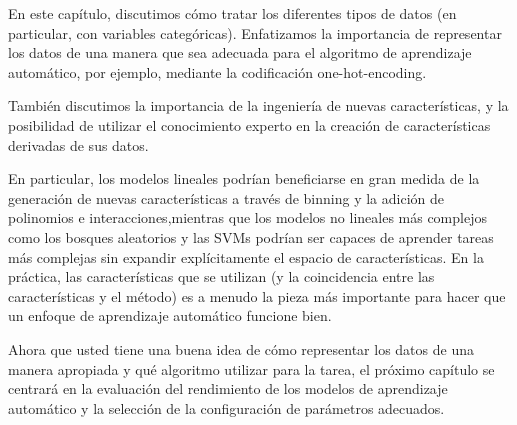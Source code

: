 
En este capítulo, discutimos cómo tratar los diferentes tipos de datos (en particular, con variables categóricas). Enfatizamos la importancia de representar los datos de una manera que sea adecuada para el algoritmo de aprendizaje automático, por ejemplo, mediante la codificación {\ttfamily one-hot-encoding}.


También discutimos la importancia de la ingeniería de nuevas características, y la posibilidad de utilizar el conocimiento experto en la creación de características derivadas de sus datos. 

En particular, los modelos lineales podrían beneficiarse en gran medida de la generación de nuevas características a través de {\ttfamily binning} y la adición de polinomios e interacciones,mientras que los modelos no lineales más complejos como los bosques aleatorios y las SVMs podrían ser capaces de aprender tareas más complejas sin expandir explícitamente el espacio de características.
En la práctica, las características que se utilizan (y la coincidencia entre las características y el método) es a menudo la pieza más importante para hacer que un enfoque de aprendizaje automático funcione bien.
 

Ahora que usted tiene una buena idea de cómo representar los datos de una manera apropiada y qué algoritmo utilizar para la tarea, el próximo capítulo se centrará en la evaluación del rendimiento de los modelos de aprendizaje automático y la selección de la configuración de parámetros adecuados.

